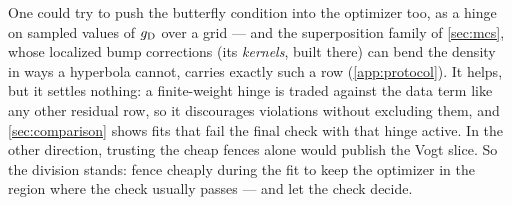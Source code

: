 One could try to push the butterfly condition into the optimizer too,
as a hinge on sampled values of $g_{\rm D}$ over a grid --- and the
superposition family of \cref{sec:mcs}, whose localized bump
corrections (its \emph{kernels}, built there) can bend the density in
ways a hyperbola cannot, carries exactly such a row
(\cref{app:protocol}).  It helps, but it settles nothing: a
finite-weight hinge is traded against the data term like any other
residual row, so it discourages violations without excluding them, and
\cref{sec:comparison} shows fits that fail the final check with that
hinge active.  In the other direction, trusting the cheap fences alone
would publish the Vogt slice.  So the division stands: fence cheaply
during the fit to keep the optimizer in the region where the check
usually passes --- and let the check decide.
